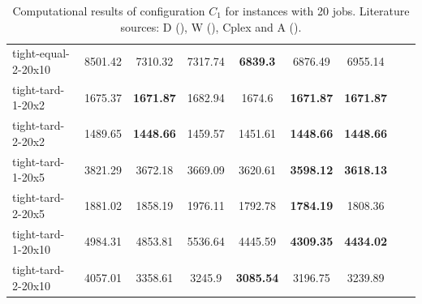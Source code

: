 \begin{table}[ht]
{\begin{tabular}{lcccccccc}
tight-equal-2-20x10 & 8501.42 & 7310.32 & 7317.74 & \textbf{6839.3} & 6876.49 & 6955.14 \\
tight-tard-1-20x2 & 1675.37 & \textbf{1671.87} & 1682.94 & 1674.6 & \textbf{1671.87} & \textbf{1671.87} \\
tight-tard-2-20x2 & 1489.65 & \textbf{1448.66} & 1459.57 & 1451.61 & \textbf{1448.66} & \textbf{1448.66} \\
tight-tard-1-20x5 & 3821.29 & 3672.18 & 3669.09 & 3620.61 & \textbf{3598.12} & \textbf{3618.13} \\
tight-tard-2-20x5 & 1881.02 & 1858.19 & 1976.11 & 1792.78 & \textbf{1784.19} & 1808.36 \\
tight-tard-1-20x10 & 4984.31 & 4853.81 & 5536.64 & 4445.59 & \textbf{4309.35} & \textbf{4434.02} \\
tight-tard-2-20x10 & 4057.01 & 3358.61 & 3245.9 & \textbf{3085.54} & 3196.75 & 3239.89 \\
\hline
\end{tabular}
}
\caption{Computational results of configuration $C_1$ for instances with 20 jobs. Literature sources: D (\citet{dos2010combination}), W (\citet{wang2014variable}), Cplex and A (\citet{ahmadian2021meta}).}
\label{tab:results_20}
\end{table}
